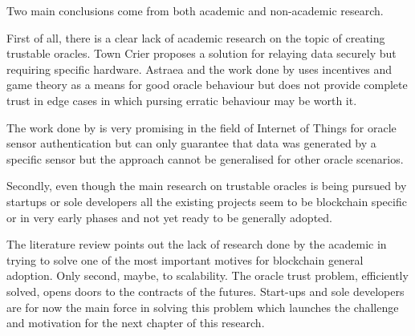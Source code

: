 Two main conclusions come from both academic and non-academic research.


First of all, there is a clear lack of academic research on the topic of creating trustable oracles. Town Crier proposes a solution for relaying data securely but requiring specific hardware. Astraea and the work done by \cite{MontotoMonroy2018BitcoinBlockchain} uses incentives and game theory as a means for good oracle behaviour but does not provide complete trust in edge cases in which pursing erratic behaviour may be worth it.

The work done by \cite{Eberhardt2018Off-chainingComputations} is very promising in the field of Internet of Things for oracle sensor authentication but can only guarantee that data was generated by a specific sensor but the approach cannot be generalised for other oracle scenarios.

Secondly, even though the main research on trustable oracles is being pursued by startups or sole developers all the existing projects seem to be blockchain specific or in very early phases and not yet ready to be generally adopted.


The literature review points out the lack of research done by the academic in trying to solve one of the most important motives for blockchain general adoption. Only second, maybe, to scalability. The oracle trust problem, efficiently solved, opens doors to the contracts of the futures. Start-ups and sole developers are for now the main force in solving this problem which launches the challenge and motivation for the next chapter of this research.